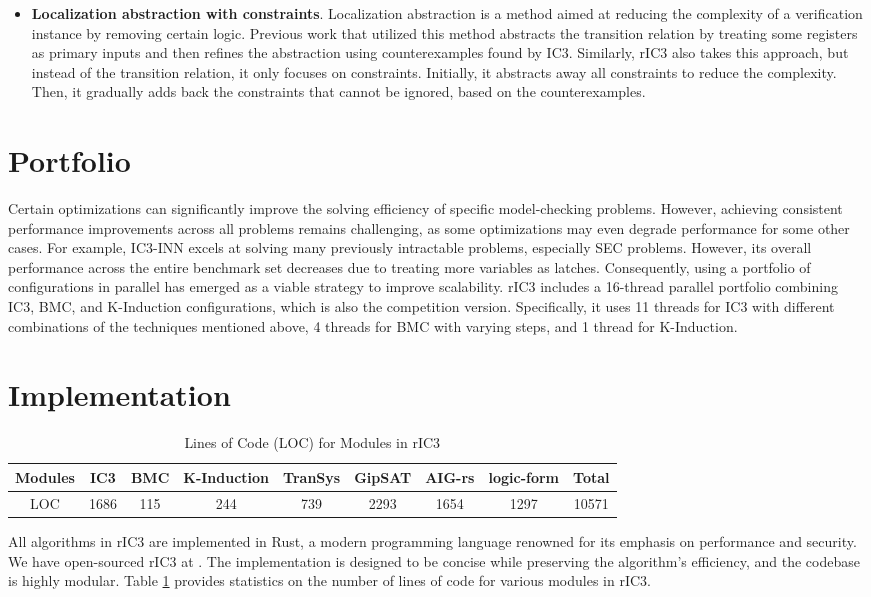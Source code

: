 \documentclass[runningheads]{llncs}
\begin{document}
\begin{itemize}
    \item \textbf{Localization abstraction with constraints}. Localization abstraction \cite{LocalAbs} is a method aimed at reducing the complexity of a verification instance by removing certain logic. Previous work \cite{IC3LocalAbs} that utilized this method abstracts the transition relation by treating some registers as primary inputs and then refines the abstraction using counterexamples found by IC3. Similarly, rIC3 also takes this approach, but instead of the transition relation, it only focuses on constraints. Initially, it abstracts away all constraints to reduce the complexity. Then, it gradually adds back the constraints that cannot be ignored, based on the counterexamples.
\end{itemize}

\section{Portfolio}
Certain optimizations can significantly improve the solving efficiency of specific model-checking problems. However, achieving consistent performance improvements across all problems remains challenging, as some optimizations may even degrade performance for some other cases. For example, IC3-INN \cite{IC3INN} excels at solving many previously intractable problems, especially SEC problems. However, its overall performance across the entire benchmark set decreases due to treating more variables as latches. Consequently, using a portfolio of configurations in parallel has emerged as a viable strategy to improve scalability. rIC3 includes a 16-thread parallel portfolio combining IC3, BMC, and K-Induction configurations, which is also the competition version. Specifically, it uses 11 threads for IC3 with different combinations of the techniques mentioned above, 4 threads for BMC with varying steps, and 1 thread for K-Induction.

\section{Implementation}
\begin{table}
\centering
\caption{Lines of Code (LOC) for Modules in rIC3}
\label{tab:LOC}
\begin{tabular}{c c c c c c c c c}
\hline
Modules           & IC3   & BMC   & K-Induction & TranSys  & GipSAT & AIG-rs & logic-form & Total \\
\hline  
LOC     &1686   & 115   & 244      & 739          & 2293  & 1654 & 1297 &  10571 \\
\hline
\end{tabular}
\end{table}
All algorithms in rIC3 are implemented in Rust, a modern programming language renowned for its emphasis on performance and security. We have open-sourced rIC3 at \cite{rIC3}. The implementation is designed to be concise while preserving the algorithm’s efficiency, and the codebase is highly modular. Table \ref{tab:LOC} provides statistics on the number of lines of code for various modules in rIC3.
\end{document}
